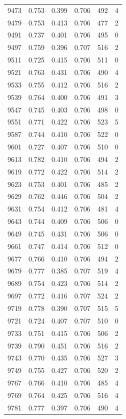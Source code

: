 \documentclass[11pt,a4paper,reqno]{amsart}
\theoremstyle{remark}
\numberwithin{equation}{section}
\begin{document}
\begin{table}[p]
\begin{tabular}{@{}rccccr@{}}
9473 & 0.753 & 0.399 & 0.706 & 492 & 4\\
9479 & 0.753 & 0.413 & 0.706 & 477 & 2\\
9491 & 0.737 & 0.401 & 0.706 & 495 & 0\\
9497 & 0.759 & 0.396 & 0.707 & 516 & 2\\
9511 & 0.725 & 0.415 & 0.706 & 511 & 0\\
9521 & 0.763 & 0.431 & 0.706 & 490 & 4\\
9533 & 0.755 & 0.412 & 0.706 & 516 & 2\\
9539 & 0.764 & 0.400 & 0.706 & 491 & 3\\
9547 & 0.745 & 0.403 & 0.706 & 498 & 0\\
9551 & 0.771 & 0.422 & 0.706 & 523 & 5\\
9587 & 0.744 & 0.410 & 0.706 & 522 & 0\\
9601 & 0.727 & 0.407 & 0.706 & 510 & 0\\
9613 & 0.782 & 0.410 & 0.706 & 494 & 2\\
9619 & 0.772 & 0.422 & 0.706 & 514 & 2\\
9623 & 0.753 & 0.401 & 0.706 & 485 & 2\\
9629 & 0.762 & 0.446 & 0.706 & 504 & 2\\
9631 & 0.754 & 0.412 & 0.706 & 481 & 4\\
9643 & 0.744 & 0.409 & 0.706 & 506 & 0\\
9649 & 0.745 & 0.431 & 0.706 & 506 & 0\\
9661 & 0.747 & 0.414 & 0.706 & 512 & 0\\
9677 & 0.766 & 0.410 & 0.706 & 494 & 2\\
9679 & 0.777 & 0.385 & 0.707 & 519 & 4\\
9689 & 0.754 & 0.423 & 0.706 & 514 & 2\\
9697 & 0.772 & 0.416 & 0.707 & 524 & 2\\
9719 & 0.778 & 0.390 & 0.707 & 515 & 5\\
9721 & 0.724 & 0.407 & 0.707 & 510 & 0\\
9733 & 0.751 & 0.415 & 0.706 & 506 & 2\\
9739 & 0.790 & 0.451 & 0.706 & 516 & 2\\
9743 & 0.770 & 0.435 & 0.706 & 527 & 3\\
9749 & 0.755 & 0.427 & 0.706 & 520 & 2\\
9767 & 0.766 & 0.410 & 0.706 & 485 & 4\\
9769 & 0.764 & 0.425 & 0.706 & 516 & 4\\
9781 & 0.777 & 0.397 & 0.706 & 490 & 4\\

\end{tabular}
\end{table}
\end{document}
